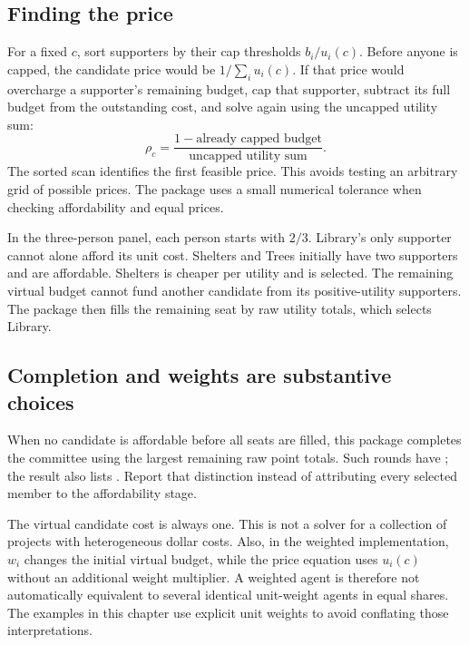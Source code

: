 \subsection{Finding the price}
For a fixed $c$, sort supporters by their cap thresholds $b_i/u_i(c)$. Before anyone is capped, the candidate price would be $1/\sum_i u_i(c)$. If that price would overcharge a supporter's remaining budget, cap that supporter, subtract its full budget from the outstanding cost, and solve again using the uncapped utility sum:
\[
\rho_c=\frac{1-\text{already capped budget}}{\text{uncapped utility sum}}.
\]
The sorted scan identifies the first feasible price. This avoids testing an arbitrary grid of possible prices. The package uses a small numerical tolerance when checking affordability and equal prices.

In the three-person panel, each person starts with $2/3$. Library's only supporter cannot alone afford its unit cost. Shelters and Trees initially have two supporters and are affordable. Shelters is cheaper per utility and is selected. The remaining virtual budget cannot fund another candidate from its positive-utility supporters. The package then fills the remaining seat by raw utility totals, which selects Library.

\subsection{Completion and weights are substantive choices}
When no candidate is affordable before all seats are filled, this package completes the committee using the largest remaining raw point totals. Such rounds have ; the result also lists . Report that distinction instead of attributing every selected member to the affordability stage.

The virtual candidate cost is always one. This is not a solver for a collection of projects with heterogeneous dollar costs. Also, in the weighted implementation, $w_i$ changes the initial virtual budget, while the price equation uses $u_i(c)$ without an additional weight multiplier. A weighted agent is therefore not automatically equivalent to several identical unit-weight agents in equal shares. The examples in this chapter use explicit unit weights to avoid conflating those interpretations.

